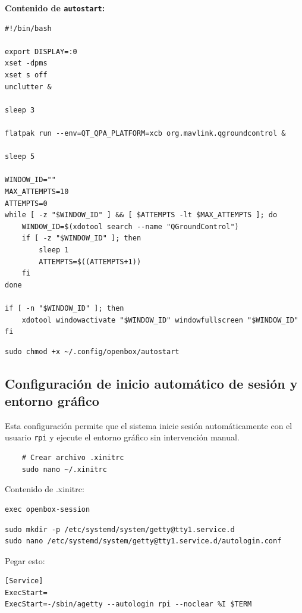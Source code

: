 \documentclass[12pt]{article}
\begin{document}
\noindent
\textbf{Contenido de \texttt{autostart}:}

\begin{lstlisting}
#!/bin/bash

export DISPLAY=:0
xset -dpms
xset s off
unclutter &

sleep 3

flatpak run --env=QT_QPA_PLATFORM=xcb org.mavlink.qgroundcontrol &

sleep 5

WINDOW_ID=""
MAX_ATTEMPTS=10
ATTEMPTS=0
while [ -z "$WINDOW_ID" ] && [ $ATTEMPTS -lt $MAX_ATTEMPTS ]; do
    WINDOW_ID=$(xdotool search --name "QGroundControl")
    if [ -z "$WINDOW_ID" ]; then
        sleep 1
        ATTEMPTS=$((ATTEMPTS+1))
    fi
done

if [ -n "$WINDOW_ID" ]; then
    xdotool windowactivate "$WINDOW_ID" windowfullscreen "$WINDOW_ID"
fi
\end{lstlisting}

\begin{lstlisting}
sudo chmod +x ~/.config/openbox/autostart
\end{lstlisting}

\subsection{Configuración de inicio automático de sesión y entorno gráfico}

Esta configuración permite que el sistema inicie sesión automáticamente con el usuario \texttt{rpi} y ejecute el entorno gráfico sin intervención manual.

\begin{lstlisting}
    # Crear archivo .xinitrc
    sudo nano ~/.xinitrc     
\end{lstlisting}

Contenido de .xinitrc:

\begin{lstlisting}
exec openbox-session
\end{lstlisting}

\begin{lstlisting}
sudo mkdir -p /etc/systemd/system/getty@tty1.service.d
sudo nano /etc/systemd/system/getty@tty1.service.d/autologin.conf
\end{lstlisting}

Pegar esto:

\begin{lstlisting}
[Service]
ExecStart=
ExecStart=-/sbin/agetty --autologin rpi --noclear %I $TERM
\end{lstlisting}
\end{document}
